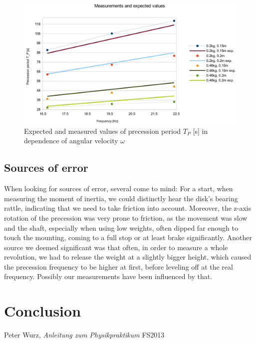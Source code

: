 \documentclass{scrreprt}
\begin{document}
\begin{figure}[H]
	\centering
  \includegraphics[width=1.0\textwidth]{diag/meas_exp_crop.pdf}
	\caption{Expected and measured values of precession period $T_P$ [s] in dependence of angular velocity $\omega$}
	\label{fig:meas_exp}
\end{figure}

\subsection{Sources of error}
When looking for sources of error, several come to mind: For a start, when measuring the moment of inertia, we could distinctly hear the disk's bearing rattle, indicating that we need to take friction into account. Moreover, the z-axis rotation of the precession was very prone to friction, as the movement was slow and the shaft, especially when using low weights, often dipped far enough to touch the mounting, coming to a full stop or at least brake significantly. Another source we deemed significant was that often, in order to measure a whole revolution, we had to release the weight at a slightly bigger height, which caused the precession frequency to be higher at first, before leveling off at the real frequency. Possibly our measurements have been influenced by that.

\section{Conclusion}

\begin{thebibliography}{9}

  Peter Wurz,
  \emph{Anleitung zum Physikpraktikum}
  FS2013

\end{thebibliography}
\end{document}
